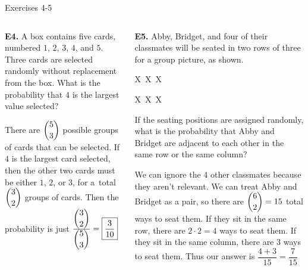 \documentclass[9pt,aspectratio=169]{beamer}
\begin{document}
\begin{frame}{Exercises 4-5}
  \begin{columns}[T]
    \begin{column}{0.5\textwidth}
      \begin{problem}
        \textbf{E4.} A box contains five cards, numbered $1$, $2$, $3$, $4$, and $5$. Three cards are selected randomly without replacement from the box. What is the probability that $4$ is the largest value selected?
      \end{problem}
      There are $\dbinom{5}{3}$ possible groups of cards that can be selected. If $4$ is the largest card selected, then the other two cards must be either $1$, $2$, or $3$, for a~total $\dbinom{3}{2}$ groups of cards. Then the probability is just ${\frac{{\dbinom{3}{2}}}{{\dbinom{5}{3}}}} = \boxed{\frac{3}{10}}$
    \end{column}
    \begin{column}{0.5\textwidth}
      \begin{problem}
        \textbf{E5.} Abby, Bridget, and four of their classmates will be seated in two rows of three for a group picture, as shown.
        \begin{center}
          \vspace*{-\baselineskip}
          \quad X\ X\ X
  
          \quad X\ X\ X  
        \end{center}
        If the seating positions are assigned randomly, what is the probability that Abby and Bridget are adjacent to each other in the same row or the same column?
      \end{problem}
      We can ignore the $4$ other classmates because they aren't relevant. We can treat Abby and Bridget as a pair, so there are $\dbinom{6}{2}=15$ total ways to seat them. If they sit in the same row, there are $2\cdot2=4$ ways to seat them. If they sit in the same column, there are $3$ ways to seat them. Thus our answer is $\dfrac{4+3}{15} = \boxed{\dfrac{7}{15}}$
    \end{column}
  \end{columns}
\end{frame}
\end{document}
